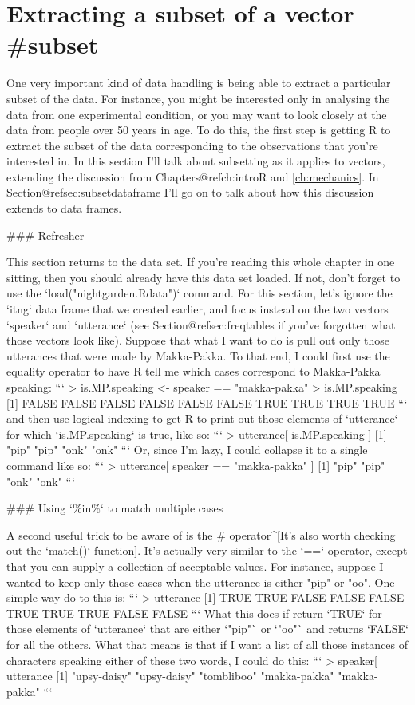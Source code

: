 \section{Extracting a subset of a vector {#subset}}

One very important kind of data handling is being able to extract a particular subset of the data. For instance, you might be interested only in analysing the data from one experimental condition, or you may want to look closely at the data from people over 50 years in age. To do this, the first step is getting R to extract the subset of the data corresponding to the observations that you're interested in. In this section I'll talk about subsetting as it applies to vectors, extending the discussion from Chapters@refch:introR and \ref{ch:mechanics}. In Section@refsec:subsetdataframe I'll go on to talk about how this discussion extends to  data frames.

### Refresher

This section returns to the  data set. If you're reading this whole chapter in one sitting, then you should already have this data set loaded. If not, don't forget to use the `load("nightgarden.Rdata")` command. For this section, let's ignore the `itng` data frame that we  created earlier, and focus instead on the two vectors `speaker` and `utterance` (see Section@refsec:freqtables if you've forgotten what those vectors look like). Suppose that what I want to do is pull out only those utterances that were made by Makka-Pakka. To that end, I could first use the equality operator to have R tell me which cases correspond to Makka-Pakka speaking:
```
> is.MP.speaking <- speaker == "makka-pakka"
> is.MP.speaking
 [1] FALSE FALSE FALSE FALSE FALSE FALSE  TRUE  TRUE  TRUE  TRUE
```
and then use logical indexing to get R to print out those elements of `utterance` for which `is.MP.speaking` is true, like so:
```
> utterance[ is.MP.speaking ]
[1] "pip" "pip" "onk" "onk"
```
Or, since I'm lazy, I could collapse it to a single command like so:
```
> utterance[ speaker == "makka-pakka" ]
[1] "pip" "pip" "onk" "onk"
```

### Using `\%in\%` to match multiple cases

A second useful trick to be aware of is the \rtextverb#%
operator^[It's also worth checking out the `match()` function]. It's actually very similar to the `==` operator, except that you can supply a collection of acceptable values. For instance, suppose I wanted to keep only those cases when the utterance is either "pip" or "oo". One simple way do to this is:
```
> utterance %
 [1]  TRUE  TRUE FALSE FALSE FALSE  TRUE  TRUE  TRUE FALSE FALSE
```
What this does if return `TRUE` for those elements of `utterance` that are either `"pip"` or `"oo"` and returns `FALSE` for all the others. What that means is that if I want a list of all those instances of characters speaking either of these two words, I could do this:
```
> speaker[ utterance %
[1] "upsy-daisy"  "upsy-daisy"  "tombliboo"   "makka-pakka" "makka-pakka"
```




